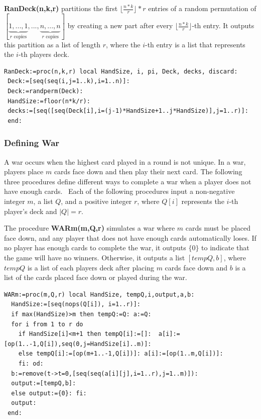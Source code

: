 \documentclass[12pt]{amsart}
\begin{document}
\textbf{RanDeck(n,k,r)} partitions the first $\lfloor\frac{n*k}{r}\rfloor *r $ entries of a random permutation of $[ \underbrace{1,...,1}_{r \text{ copies}},...,\underbrace{n,...,n}_{r \text{ copies}}]$ by creating a new part after every $\lfloor \frac{n*k}{r} \rfloor$-th entry. It outputs this partition as a list of length $r$, where the $i$-th entry is a list that represents the $i$-th players deck.


\begin{lstlisting}
RanDeck:=proc(n,k,r) local HandSize, i, pi, Deck, decks, discard:
 Deck:=[seq(seq(i,j=1..k),i=1..n)]:
 Deck:=randperm(Deck):
 HandSize:=floor(n*k/r):
 decks:=[seq([seq(Deck[i],i=(j-1)*HandSize+1..j*HandSize)],j=1..r)]:
 end:
\end{lstlisting}


\subsubsection{Defining War}\hfill


A war occurs when the highest card played in a round is not unique. In a war, players place $m$ cards face down and then play their next card. The following three procedures define different ways to complete a war when a player does not have enough cards.  Each of the following procedures input a non-negative integer $m$, a list $Q$, and a positive integer $r$, where $Q[i]$ represents the $i$-th player's deck and $|Q|=r$.


The procedure \textbf{WARm(m,Q,r)} simulates a war where $m$ cards must be placed face down, and any player that does not have enough cards automatically loses. If no player has enough cards to complete the war, it outputs $\{0\}$ to indicate that the game will have no winners. Otherwise, it outputs a list $[tempQ,b]$, where $tempQ$ is a list of each players deck after placing $m$ cards face down and $b$ is a list of the cards placed face down or played during the war.


\begin{lstlisting}
WARm:=proc(m,Q,r) local HandSize, tempQ,i,output,a,b:
  HandSize:=[seq(nops(Q[i]), i=1..r)]:
  if max(HandSize)>m then tempQ:=Q: a:=Q:
  for i from 1 to r do 
    if HandSize[i]<m+1 then tempQ[i]:=[]:  a[i]:=[op(1..-1,Q[i]),seq(0,j=HandSize[i]..m)]: 
    else tempQ[i]:=[op(m+1..-1,Q[i])]: a[i]:=[op(1..m,Q[i])]: 
    fi: od: 
  b:=remove(t->t=0,[seq(seq(a[i][j],i=1..r),j=1..m)]):
  output:=[tempQ,b]:
  else output:={0}: fi:
  output:
 end:
\end{lstlisting}
\end{document}
